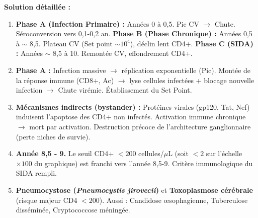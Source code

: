 \documentclass[11pt]{article}
\begin{document}
\begin{exoresolu}
\textbf{Solution détaillée :}
\begin{enumerate}
    \item \textbf{Phase A (Infection Primaire) :} Années 0 à 0,5. Pic CV $\to$ Chute. Séroconversion vers 0,1-0,2 an.
    \textbf{Phase B (Phase Chronique) :} Années 0,5 à $\sim$ 8,5. Plateau CV (Set point $\sim 10^4$), déclin lent CD4+.
    \textbf{Phase C (SIDA) :} Années $\sim$ 8,5 à 10. Remontée CV, effondrement CD4+.
    \item \textbf{Phase A :} Infection massive $\rightarrow$ réplication exponentielle (Pic). Montée de la réponse immune (CD8+, Ac) $\rightarrow$ lyse cellules infectées + blocage nouvelle infection $\rightarrow$ Chute virémie. Établissement du Set Point.
    \item \textbf{Mécanismes indirects (bystander) :} Protéines virales (gp120, Tat, Nef) induisent l'apoptose des CD4+ non infectés. Activation immune chronique $\rightarrow$ mort par activation. Destruction précoce de l'architecture ganglionnaire (perte niches de survie).
    \item \textbf{Année 8,5 - 9.} Le seuil CD4+ $< 200$ cellules/$\mu$L (soit $< 2$ sur l'échelle $\times 100$ du graphique) est franchi vers l'année 8,5-9. Critère immunologique du SIDA rempli.
    \item \textbf{Pneumocystose (\emph{Pneumocystis jirovecii})} et \textbf{Toxoplasmose cérébrale} (risque majeur CD4 $< 200$). Aussi : Candidose œsophagienne, Tuberculose disséminée, Cryptococcose méningée.
\end{enumerate}
\end{exoresolu}
\end{document}
